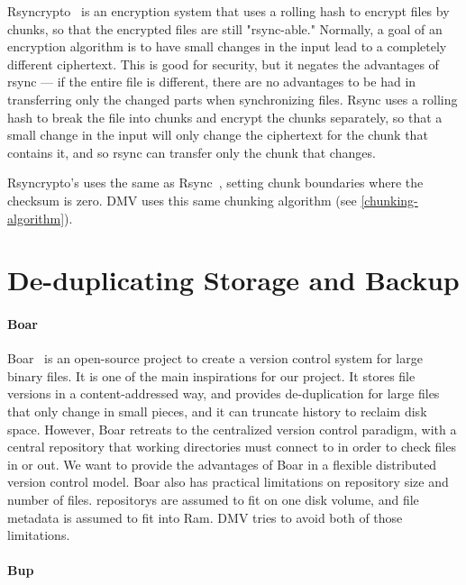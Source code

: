 Rsyncrypto~\cite{rsyncrypto_algorithm} is an encryption system that uses a
roll\-ing hash to encrypt files by chunks, so that the encrypted files are still
"rsync-able." Normally, a goal of an encryption algorithm is to have small
changes in the input lead to a completely different ciphertext. This is good for
security, but it negates the advantages of rsync --- if the entire file is
different, there are no advantages to be had in transferring only the changed
parts when synchronizing files. Rsync uses a rolling hash to break the file into
chunks and encrypt the chunks separately, so that a small change in the input
will only change the ciphertext for the chunk that contains it, and so rsync can
transfer only the chunk that changes.

Rsyncrypto's uses the same  as
Rsync~\cite{rsyncrypto_algorithm,rsynctechreport}, setting chunk boundaries where
the checksum is zero. \gls{DMV} uses this same chunking algorithm (see
\autoref{chunking-algorithm}).


\section{De-duplicating Storage and Backup}

\paragraph{Boar}

Boar~\cite{boar_homepage} is an open-source project to create a version control
system for large binary files. It is one of the main inspirations for our
project. It stores file versions in a content-addressed way, and provides
de-duplication for large files that only change in small pieces, and it can
truncate history to reclaim disk space. However, Boar retreats to the
centralized version control paradigm, with a central \gls{repository} that
working directories must connect to in order to check files in or out. We want
to provide the advantages of Boar in a flexible distributed version control
model. Boar also has practical limitations on \gls{repository} size and number
of files. \glspl{repository} are assumed to fit on one disk volume, and file
metadata is assumed to fit into Ram. \gls{DMV} tries to avoid both of those
limitations.


\paragraph{Bup}\label{related_bup}

